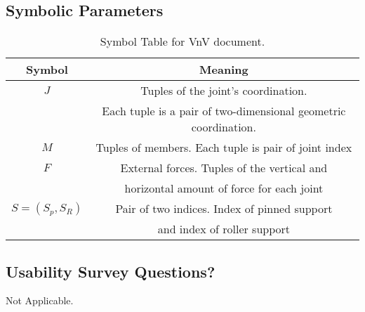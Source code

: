\documentclass[12pt, titlepage]{article}
\begin{document}
\subsection{Symbolic Parameters}
\begin{table} [h!]
\centering
\begin{tabular}{|c| c |}
\hline
Symbol & Meaning   \\
 \hline   
 $J$& Tuples of the joint's coordination.\\
 &Each tuple is a pair of two-dimensional geometric coordination.   \\
 \hline
 $M$ & Tuples of members. Each tuple is pair of joint index  \\
 \hline
 $F$ & External forces. Tuples of the vertical and\\
 & horizontal amount of force for each joint  \\
 \hline
 $S=(S_{p} ,S_R)$ &Pair of two indices. Index of pinned support\\
 & and index of roller support \\
 \hline

 
\end{tabular}
\caption{\label{tbl_tr_TC} Symbol Table for VnV document.}
\end{table}

\subsection{Usability Survey Questions?}

Not Applicable.

\newpage{}
\end{document}
